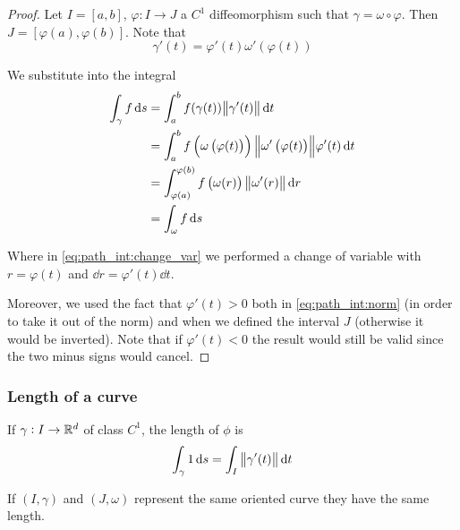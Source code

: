 \documentclass[12pt]{extarticle}
\begin{document}
\begin{proof}
    Let $I = [a, b]$, $\varphi: I \to J$ a $C^1$ diffeomorphism such that $\gamma = \omega \circ \varphi$. Then $J = [\varphi(a), \varphi(b)]$.
    Note that
    \begin{equation}
        \gamma'(t) = \varphi'(t)\omega'(\varphi(t))
    \end{equation}

    We substitute into the integral
    \begin{align}
        \int_\gamma f \dd{s} & = \int_a^b f(\gamma (t)) \norm{\gamma'(t)} \dd{t}                                                                                        \\
                             & =\int_a^b f\left(\omega\left(\varphi (t)\right)\right) \norm{\omega'\left(\varphi(t)\right)} \varphi'(t) \dd{t} \label{eq:path_int:norm} \\
                             & = \int_{\varphi(a)}^{\varphi(b)} f\left(\omega (r)\right) \norm{\omega'(r)} \dd{r} \label{eq:path_int:change_var}                        \\
                             & = \int_\omega f \dd{s}
    \end{align}

    Where in \autoref{eq:path_int:change_var} we performed a change of variable with $r = \varphi(t)$ and $\dd{r} = \varphi'(t) \dd{t}$.

    Moreover, we used the fact that $\varphi'(t) > 0$ both in \autoref{eq:path_int:norm} (in order to take it out of the norm) and when we defined the interval $J$ (otherwise it would be inverted).
    Note that if $\varphi'(t) < 0$ the result would still be valid since the two minus signs would cancel.
\end{proof}

\subsubsection{Length of a curve}

\begin{definition}
    If $\gamma: I \to \mathbb{R}^d$ of class $C^1$, the length of $\phi$ is
    \begin{equation}
        \int_\gamma 1 \dd{s} = \int_I \norm{\gamma'(t)} \dd{t}
    \end{equation}
\end{definition}

\begin{lemma}
    If $(I, \gamma)$ and $(J, \omega)$ represent the same oriented curve they have the same length.
\end{lemma}
\end{document}

